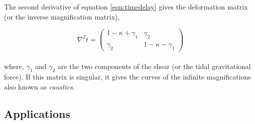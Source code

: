 The second derivative of equation \ref{eqn:timedelay} gives the
deformation matrix (or the inverse magnification matrix),

\begin{equation}
	\nabla^2 t = \begin{pmatrix}
 				 1-\kappa+\gamma_1 &  \gamma_2 \\
  					\gamma_2 & 1-\kappa-\gamma_1
 				\end{pmatrix}
\end{equation}
\\
where, $\gamma_1$ and $\gamma_2$ are the two components of the shear (or the tidal
gravitational force). If this matrix is singular, it gives the curves of the
infinite magnifications also known as {\it caustics}.



\subsection{Applications}

